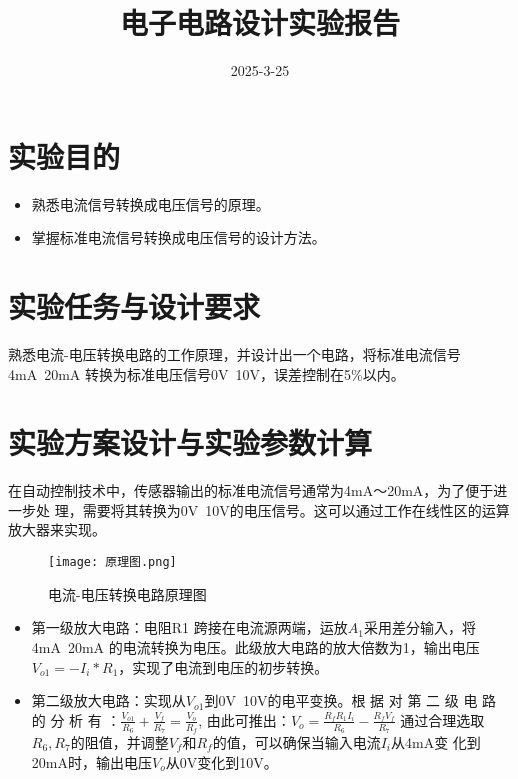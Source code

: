 \documentclass{zjureport}
\title{电子电路设计实验报告}
\date{2025-3-25}
\begin{document}
\makecover


\makeheader



\section{实验目的}
\begin{itemize}
  \item 熟悉电流信号转换成电压信号的原理。
  \item 掌握标准电流信号转换成电压信号的设计方法。
\end{itemize}

\section{实验任务与设计要求}
熟悉电流-电压转换电路的工作原理，并设计出一个电路，将标准电流信号 4mA~20mA 转换为标准电压信号0V~10V，误差控制在5\%以内。
\section{实验方案设计与实验参数计算}
在自动控制技术中，传感器输出的标准电流信号通常为4mA～20mA，为了便于进一步处 理，需要将其转换为0V~10V的电压信号。这可以通过工作在线性区的运算放大器来实现。
\begin{figure}[h]
  \begin{center}
  \texttt{[image: 原理图.png]}
  \end{center}
  \caption{电流-电压转换电路原理图}
\end{figure}

\begin{itemize}
  \item 第一级放大电路：电阻R1 跨接在电流源两端，运放$A_1$采用差分输入，将4mA~20mA 的电流转换为电压。此级放大电路的放大倍数为1，输出电压$V_{o1} = -I_i*R_1$，实现了电流到电压的初步转换。
  \item 第二级放大电路：实现从$V_{o1}$到0V~10V的电平变换。根 据 对 第 二 级 电 路 的 分 析 有 ：$\frac{V_{o1}}{R_6}+\frac{V_f}{R_7}=\frac{V_o}{R_f}$, 由此可推出：$V_o=\frac{R_fR_1I_i}{R_6}-\frac{R_fV_f}{R_7}$ 
  通过合理选取$R_6,R_7$的阻值，并调整$V_f$和$R_f$的值，可以确保当输入电流$I_i$从4mA变 化到20mA时，输出电压$V_o$从0V变化到10V。
  
\end{itemize}
\end{document}

